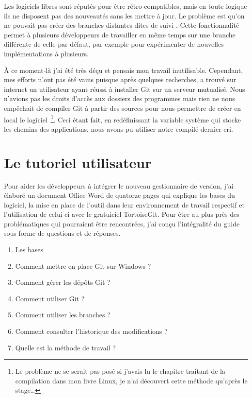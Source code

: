 Les logiciels libres sont réputés pour être rétro-compatibles, mais en
toute logique ils ne disposent pas des nouveautés sans les mettre à jour.
Le problème est qu'on ne pouvait pas créer des branches distantes dites
\og de suivi \fg{}. Cette fonctionnalité permet à plusieurs développeurs
de travailler en même temps sur une branche différente de celle par
défaut, par exemple pour expérimenter de nouvelles implémentations à
plusieurs.

À ce moment-là j'ai été très déçu et pensais mon travail inutilisable.
Cependant, mes efforts n'ont pas été vains puisque  après
quelques recherches, a trouvé sur internet un utilisateur ayant réussi à
installer Git sur un serveur mutualisé.  Nous n'avions pas les droits
d'accès aux dossiers des programmes mais rien ne nous empêchait de
compiler Git à partir des sources pour nous permettre de créer en local
le logiciel\, \footnote{Le problème ne se serait pas posé si j'avais lu
le chapitre traitant de la compilation dans mon livre Linux, je n'ai
découvert cette méthode qu'après le stage\dots}. Ceci étant fait, en
redéfinissant la variable système qui stocke les chemins des
applications, nous avons pu utiliser notre compilé dernier cri.

\section{Le tutoriel utilisateur} %
\label{sec:Le tutoriel utilisateur}

Pour aider les développeurs à intégrer le nouveau gestionnaire de
version, j'ai élaboré un document Office Word de
quatorze pages qui explique les bases du logiciel, la mise en place de
l'outil dans leur environnement de travail respectif et l'utilisation de
celui-ci avec le gratuiciel TortoiseGit.  Pour être au plus près des
problématiques qui pourraient être rencontrées, j'ai conçu l'intégralité
du guide sous forme de questions et de réponses.

\begin{enumerate}
  \item Les bases
  \item Comment mettre en place Git sur Windows ?
  \item Comment gérer les dépôts Git ?
  \item Comment utiliser Git ?
  \item Comment utiliser les branches ?
  \item Comment consulter l'historique des modifications ?
  \item Quelle est la méthode de travail ?
\end{enumerate}

